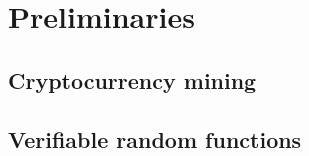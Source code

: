\section{Preliminaries}

\subsection{Cryptocurrency mining}

\subsection{Verifiable random functions}